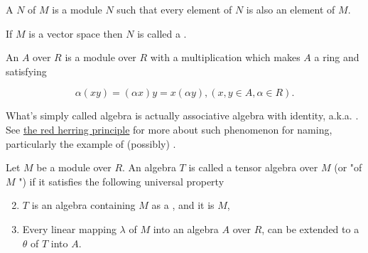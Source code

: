 \begin{definition}[Submodule]
    \label{Submodule}
    \leanok

    A  $N$ of $M$ is a module $N$ such that every element of $N$ is also an element of $M$.

\end{definition}

\begin{remark}
    \label{mk:Submodule}

    If $M$ is a vector space then $N$ is called a .
    
\end{remark}

\begin{definition}[Algebra]
    \label{Algebra}
    \leanok

    An  $A$ over $R$ is a module over $R$ with a multiplication which makes $A$ a ring and satisfying

    $$
    \alpha(x y)=(\alpha x) y=x(\alpha y),(x, y \in A, \alpha \in R) .
    $$

\end{definition}

\begin{remark}
    \label{mk:Algebra}

    What's simply called algebra is actually associative algebra with identity, a.k.a. . See
    \href{https://ncatlab.org/nlab/show/red%20herring%20principle}{the red herring principle}
    for more about such phenomenon for naming, particularly the example of (possibly) .
    
\end{remark}

\begin{definition}
    \label{TensorAlgebra}
    \leanok

    Let $M$ be a module over $R$. An algebra $T$ is called a tensor algebra over $M$ (or "of $M$ ")
    if it satisfies the following universal property

    \begin{enumerate}
    \setcounter{enumi}{1}
    \item $T$ is an algebra containing $M$ as a , and it is  $M$,
    \item Every linear mapping $\lambda$ of $M$ into an algebra $A$ over $R$, can be extended to 
    a  $\theta$ of $T$ into $A$.
    \end{enumerate}

\end{definition}